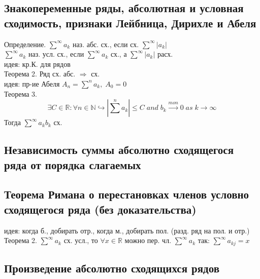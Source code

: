 \documentclass{article}
\begin{document}
\subsection{Знакопеременные ряды, абсолютная и условная сходимость, признаки Лейбница, Дирихле и Абеля}
Определение. $\overset{\infty}{\sum} a_k$ наз. абс. сх., если сх. $\overset{\infty}{\sum} |a_k|$ \\
$\overset{\infty}{\sum} a_k$ наз. усл. сх., если $\overset{\infty}{\sum} a_k$ сх., а $\overset{\infty}{\sum} |a_k|$ расх. \\
идея: кр.К. для рядов \\
Теорема 2. Ряд сх. абс. $\Rightarrow$ сх. \\
идея: пр-ие Абеля $A_n = \overset{n}{\sum} a_k, \; A_0 = 0 $ \\
Теорема 3.
\begin{equation*}
    \exists C \in \mathbb R: \forall n \in \mathbb N \hookrightarrow |\overset{n}{\sum} a_k| \leq C \; and \; b_k \overset{mon}{\rightarrow} 0 \; as \; k \rightarrow \infty
\end{equation*}
Тогда $\overset{\infty}{\sum} a_k b_k$ сх.
\subsection{Независимость суммы абсолютно сходящегося ряда от порядка слагаемых}
\subsection{Теорема Римана о перестановках
членов условно сходящегося ряда (без доказательства)}
идея: когда б., добирать отр., когда м., добирать пол. (разд. ряд на пол. и отр.) \\
Теорема 2. $\overset{\infty}{\sum} a_k$ сх. усл., то $\forall x \in \mathbb R$ можно пер. чл. $\overset{\infty}{\sum} a_k$ так: $\overset{\infty}{\sum} a_{kj} = x$
\subsection{Произведение абсолютно сходящихся рядов}
\end{document}
